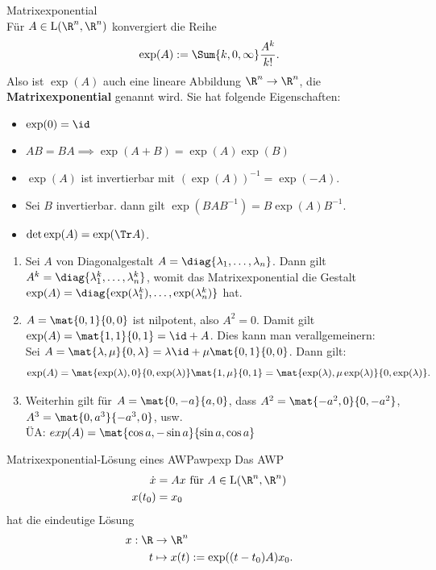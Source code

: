 \begin{bemerkung}Matrixexponential\\
Für $A \in \text{L}(\R^n, \R^n)$ konvergiert die Reihe
\begin{equation}
\exp(A) := \Sum{k,0,\infty} \frac{A^k}{k!}.
\end{equation}
Also ist $\exp(A)$ auch eine lineare Abbildung $\R^n \to \R^n$, die \textbf{Matrixexponential} genannt wird. Sie hat folgende Eigenschaften:
\begin{itemize}
\item $\exp(0) = \id$
\item $AB = BA \implies \exp(A+B)=\exp(A)\exp(B)$
\item $\exp(A)$ ist invertierbar mit $\left( \exp(A)\right)^{-1} = \exp(-A)$.
\item Sei $B$ invertierbar. dann gilt $\exp(BAB^{-1}) = B \exp(A) B^{-1}$.
\item $\det \exp(A) = \exp (\Tr A)$.
\end{itemize}
\end{bemerkung}
\begin{beispiele}
\begin{enumerate}
\item Sei $A$ von Diagonalgestalt $A = \diag \{\lambda_1, \dots, \lambda_n \}$. Dann gilt $A^k = \diag \{\lambda_1^k, \dots, \lambda_n^k \}$, womit das Matrixexponential die Gestalt $\exp(A) = \diag \{ \exp(\lambda_1^k), \dots, \exp(\lambda_n^k) \}$ hat.
\item $A= \mat{0,1}{0,0}$ ist nilpotent, also $A^2=0$. Damit gilt $\exp(A) = \mat{1,1}{0,1}=\id+ A$. Dies kann man verallgemeinern:\\
Sei $A=\mat{\lambda, \mu}{0,\lambda} = \lambda \id + \mu \mat{0,1}{0,0}$. Dann gilt:
\begin{equation}
\exp(A) = \mat{\exp(\lambda), 0}{0, \exp(\lambda)} \mat{1, \mu}{0,1} = \mat{\exp(\lambda), \mu \exp(\lambda)}{0, \exp(\lambda)}.
\end{equation}
\item Weiterhin gilt für $A = \mat{0,-a}{a,0}$, dass $A^2=\mat{-a^2, 0}{0, -a^2}$, $A^3 = \mat{0, a^3}{-a^3, 0}$, usw.\\
ÜA: $exp(A) = \mat{\cos a, -\sin a}{\sin a, \cos a}$
\end{enumerate}
\end{beispiele}
\begin{satz}{Matrixexponential-Lösung eines AWP}{awpexp}
Das AWP
\begin{align}
\dot{x} &= Ax \ \text{für} \ A \in \text{L}(\R^n, \R^n)\\
x(t_0) &= x_0
\end{align}
hat die eindeutige Lösung
\begin{align}
x: \R &\to \R^n \\
t &\mapsto x(t):=\exp((t-t_0)A)x_0.
\end{align}
\end{satz}
